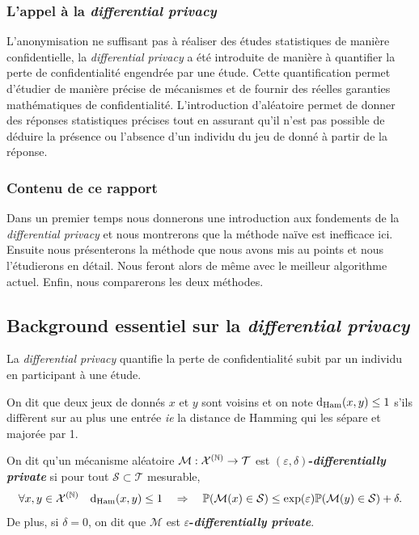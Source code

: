 \subsubsection{L'appel à la \textit{differential privacy}}

L'anonymisation ne suffisant pas à réaliser des études statistiques de manière confidentielle, la \textit{differential privacy} a été introduite de manière à quantifier la perte de confidentialité engendrée par une étude. Cette quantification permet d'étudier de manière précise de mécanismes et de fournir des réelles garanties mathématiques de confidentialité. L'introduction d'aléatoire permet de donner des réponses statistiques précises tout en assurant qu'il n'est pas possible de déduire la présence ou l'absence d'un individu du jeu de donné à partir de la réponse.

\subsubsection{Contenu de ce rapport}

Dans un premier temps nous donnerons une introduction aux fondements de la \textit{differential privacy} et nous montrerons que la méthode naïve est inefficace ici. Ensuite nous présenterons la méthode que nous avons mis au points et nous l'étudierons en détail. Nous feront alors de même avec le meilleur algorithme actuel. Enfin, nous comparerons les deux méthodes.

\subsection{Background essentiel sur la \textit{differential privacy}}

La \textit{differential privacy} \cite{10.1007/11681878_14} quantifie la perte de confidentialité subit par un individu en participant à une étude. 

\begin{definition}
    On dit que deux jeux de donnés \(x\) et \(y\) sont voisins et on note \(\mathrm{d}_{\text{Ham}}(x,y) \leq 1\) s'ils diffèrent sur au plus une entrée \textit{ie} la distance de {\sc Hamming} qui les sépare et majorée par 1.
\end{definition}
 

\begin{definition}
    On dit qu'un mécanisme aléatoire \(\mathcal M :\mathcal X^{(\mathbb{N})} \to \mathcal T\) est \textbf{\((\varepsilon, \delta)\)-\textit{differentially private}} si pour tout \(\mathcal S \subset \mathcal T \) mesurable, 
    \[
        \forall x,y \in \mathcal X^{(\mathbb{N})} \quad \mathrm{d}_{\text{Ham}}(x,y) \leq 1 \quad \Rightarrow \quad \mathbb P(\mathcal M(x) \in \mathcal S) \leq \exp(\varepsilon)  \mathbb P(\mathcal M(y) \in \mathcal S) + \delta.
    \] 
    De plus, si \(\delta = 0\), on dit que \(\mathcal M\) est \textbf{\(\varepsilon\)-\textit{differentially private}}. 
\end{definition}

